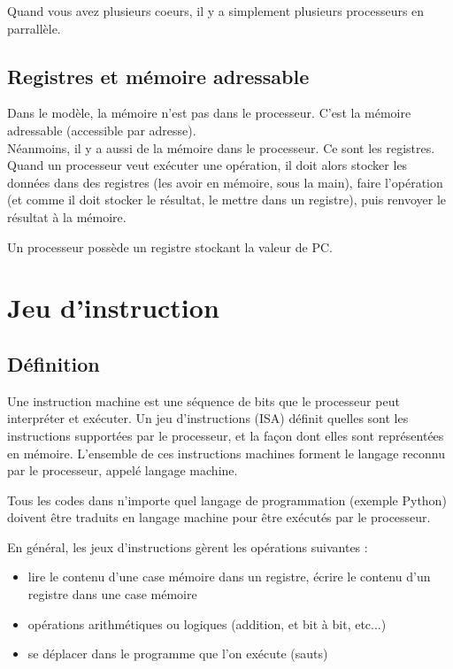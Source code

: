 \begin{rem}
	Quand vous avez plusieurs coeurs, il y a simplement plusieurs processeurs en parrallèle.
\end{rem}

\subsection{Registres et mémoire adressable}

Dans le modèle, la mémoire n'est pas dans le processeur. C'est la mémoire adressable (accessible par adresse).\\

Néanmoins, il y a aussi de la mémoire dans le processeur. Ce sont les registres. Quand un processeur veut exécuter une opération, il doit alors stocker les données dans des registres (les avoir en mémoire, sous la main), faire l'opération (et comme il doit stocker le résultat, le mettre dans un registre), puis renvoyer le résultat à la mémoire.

\begin{rem}
	Un processeur possède un registre stockant la valeur de PC.
\end{rem}

\section{Jeu d'instruction}

\subsection{Définition}

\begin{definition}
	Une instruction machine est une séquence de bits que le processeur peut interpréter et exécuter. Un jeu d'instructions (ISA) définit quelles sont les instructions supportées par le processeur, et la façon dont elles sont représentées en mémoire. L'ensemble de ces instructions machines forment le langage reconnu par le processeur, appelé langage machine. 
\end{definition}

\begin{rem}
	Tous les codes dans n'importe quel langage de programmation (exemple Python) doivent être traduits en langage machine pour être exécutés par le processeur. 
\end{rem}

\begin{proposition}
	En général, les jeux d'instructions gèrent les opérations suivantes : \begin{itemize}[label=$\bullet$]
		\item lire le contenu d'une case mémoire dans un registre, écrire le contenu d'un registre dans une case mémoire 
		\item opérations arithmétiques ou logiques (addition, et bit à bit, etc...)
		\item se déplacer dans le programme que l'on exécute (sauts)
	\end{itemize}
\end{proposition}

